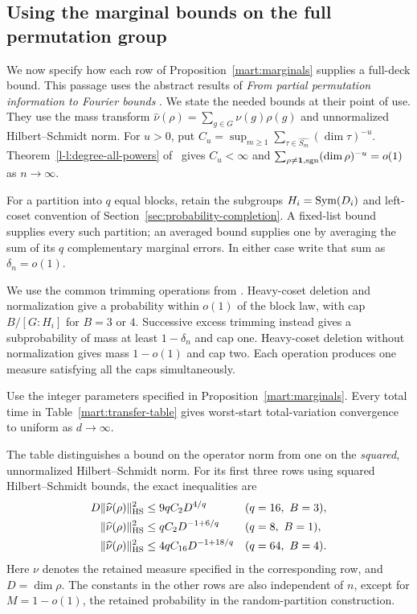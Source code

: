 \subsection{Using the marginal bounds on the full permutation group}
\label{mart:applications}

We now specify how each row of Proposition~\ref{mart:marginals} supplies
a full-deck bound. This passage uses the abstract results of
\emph{From partial permutation information to Fourier bounds}
\cite{partialFourier}. We state the needed bounds at their point of use.
They use the mass transform
$\widehat\nu(\rho)=\sum_{g\in G}\nu(g)\rho(g)$ and unnormalized
Hilbert--Schmidt norm. For $u>0$, put
$C_u=\sup_{m\ge1}\sum_{\tau\in\widehat{S_m}}(\dim\tau)^{-u}$.
Theorem~\ref*{l-l:degree-all-powers} of~\cite{partialFourier} gives $C_u<\infty$
and $\sum_{\rho\ne\mathbf1,\operatorname{sgn}}(\dim\rho)^{-u}=o(1)$ as $n\to\infty$.

For a partition into $q$ equal blocks, retain the subgroups
$H_i=\operatorname{Sym}(D_i)$ and left-coset convention of
Section~\ref{sec:probability-completion}. A fixed-list bound supplies
every such partition; an averaged bound supplies one by averaging
the sum of its $q$ complementary marginal errors. In either case write
that sum as $\delta_n=o(1)$.

We use the common trimming operations from
\cite[Lemma~\ref*{l-l:trim}]{partialFourier}. Heavy-coset deletion and
normalization give a probability within $o(1)$ of the block law,
with cap $B/[G:H_i]$ for $B=3$ or $4$. Successive excess trimming
instead gives a subprobability of mass at least $1-\delta_n$ and cap
one. Heavy-coset deletion without normalization gives mass
$1-o(1)$ and cap two. Each operation produces one measure satisfying
all the caps simultaneously.

\begin{proposition}
\label{mart:application-times}
Use the integer parameters specified in Proposition~\ref{mart:marginals}.
Every total time in Table~\ref{mart:transfer-table} gives worst-start
total-variation convergence to uniform as $d\to\infty$.
\end{proposition}

The table distinguishes a bound on the operator norm from one on the
\emph{squared}, unnormalized Hilbert--Schmidt norm. For its first three
rows using squared Hilbert--Schmidt bounds, the exact inequalities are
\begin{align}
 D\|\widehat\nu(\rho)\|_{\mathrm{HS}}^2
 &\le9qC_2D^{4/q} &&(q=16,\ B=3),\label{mart:hs16}\\
 \|\widehat\nu(\rho)\|_{\mathrm{HS}}^2
 &\le qC_2D^{-1+6/q} &&(q=8,\ B=1),\label{mart:hs8}\\
 \|\widehat\nu(\rho)\|_{\mathrm{HS}}^2
 &\le4qC_{16}D^{-1+18/q} &&(q=64,\ B=4).\label{mart:hs64}
\end{align}
Here $\nu$ denotes the retained measure specified in the corresponding
row, and $D=\dim\rho$. The constants in the other rows are also
independent of $n$, except for $M=1-o(1)$, the retained probability
in the random-partition construction.

